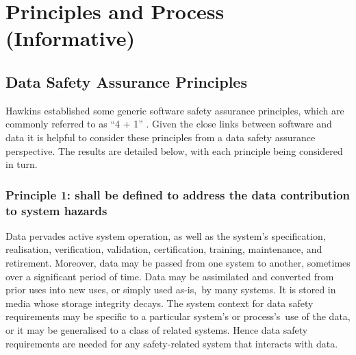 %
%
\section{Principles and Process (Informative)} \label{bkm:principlesprocess}


\subsection{Data Safety Assurance Principles}
Hawkins  established some generic software safety assurance principles, which are commonly referred to as ``4 + 1'' \cite{citation:hawkins2013principles}. Given the close links between software and data it is helpful to consider these principles from a data safety assurance perspective. The results are detailed below, with each principle being considered in turn.

\subsubsection{Principle 1:  shall be defined to address the data contribution to system hazards}
Data pervades active system operation, as well as the system's specification, realisation, \gls{verification}, \gls{validation}, certification,  training, maintenance, and retirement. Moreover, data may be passed from one system to another, sometimes over a significant period of time. Data may be assimilated and converted from prior uses into new uses, or simply used \cbstart as-is,\cbend\ by many systems. It is stored in media whose storage \gls{integrity} decays. The system context for \glspl{data safety requirement} may be specific to a particular system's \cbstart or process's\cbend\ use of the data, or it may be generalised to a class of related systems. Hence \glspl{data safety requirement} are needed for any safety-related system that interacts with data.


